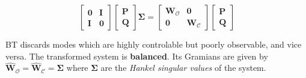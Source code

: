 \documentclass[aspectratio=169, usenames, dvipsnames]{beamer}
\begin{document}
\begin{frame}
  \vfill

  \begin{tcolorbox}[
    enhanced,
    coltitle=black,
    coltext=white,
    colback=black,
    title=\textbf{Balancing transform / Balanced tuncation},
    frame style tile={width=\paperwidth}{background.jpg}
    ]

    \medskip
    \Large

    \[
    \begin{bmatrix}
      \bm{0} & \bm{I} \\
      \bm{I} & \bm{0}
    \end{bmatrix}
    \begin{bmatrix}
      \bm{P} \\ \bm{Q}
    \end{bmatrix}
    \boldsymbol{\Sigma}
      =
    \begin{bmatrix}
      \bm{W}_{\mathcal{O}} & \bm{0} \\
      \bm{0} & \bm{W}_{\mathcal{C}}
    \end{bmatrix}
    \begin{bmatrix}
      \bm{P} \\ \bm{Q}
    \end{bmatrix}
    \]

    \medskip
  \end{tcolorbox}

  \vfill

  BT discards modes which are highly controlable but poorly observable, and vice versa.
  The transformed system is \textbf{balanced}.
  Its Gramians are given by $\hat{\bm{W}}_{\mathcal{O}} = \hat{\bm{W}}_{\mathcal{C}} = \boldsymbol{\Sigma}$ where $\boldsymbol{\Sigma}$ are the \emph{Hankel singular values} of the system.

  \vfill
\end{frame}
\end{document}
